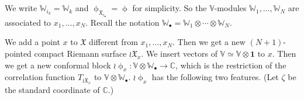 \documentclass[12pt,a4paper,notitlepage]{article}
\theoremstyle{definition}
\theoremstyle{plain}
\newcommand{\fk}{\mathfrak}
\newcommand{\wht}{\widehat}
\newcommand{\ovl}{\overline}
\newcommand{\id}{\mathbf{1}}
\newcommand{\blt}{\bullet}
\newcommand{\Vbb}{\mathbb V}
\newcommand{\Wbb}{\mathbb W}
\newcommand{\Cbb}{\mathbb C}
\numberwithin{equation}{section}
\begin{document}



\subsection{}\label{lb160}
We write $\Wbb_{i_k}=\Wbb_k$ and $\upphi_{\fk X_{i_\blt}}=\upphi$ for simplicity. So the $\Vbb$-modules $\Wbb_1,\dots,\Wbb_N$ are associated to $x_1,\dots,x_N$. Recall the notation $\Wbb_\blt=\Wbb_1\otimes\cdots\otimes\Wbb_N$.

We add a point $x$ to $\fk X$ different from $x_1,\dots,x_N$. Then we get a new $(N+1)$-pointed compact Riemann surface $\wr\fk X_x$. We insert vectors of $\Vbb\simeq \Vbb\otimes\id$ to $x$. Then we get a new conformal block $\wr\upphi_x:\Vbb\otimes\Wbb_\blt\rightarrow\Cbb$, which is the restriction of the correlation function $T_{\wr\fk X_x}$ to $\Vbb\otimes\Wbb_\blt$. $\wr\upphi_x$ has the following two features. (Let $\zeta$ be the standard coordinate of $\Cbb$.)
\end{document}
